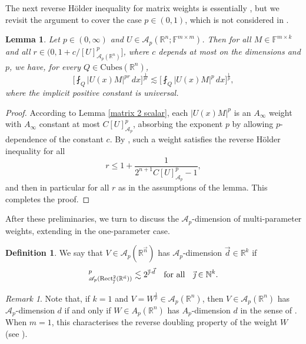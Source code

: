 \documentclass[11pt, reqno]{amsart}
\newtheorem{lemma}[theorem]{Lemma}
\theoremstyle{definition}
\newtheorem{definition}[theorem]{Definition}
\theoremstyle{remark}
\newtheorem{remark}[theorem]{Remark}
\numberwithin{equation}{section}
\newcommand{\A}{\mathscr A}
\newcommand{\F}{\mathbb F}
\newcommand{\N}{\mathbb N}
\newcommand{\R}{\mathbb R}
\newcommand{\vd}{\vec d}
\newcommand{\vj}{\vec{\textit{\j}}}
\newcommand{\vn}{\vec n}
\newcommand{\abs}[1]{|#1|}
\newcommand{\Cubes}{\mathrm{Cubes}}
\newcommand{\Rect}{\mathrm{Rect}}
\begin{document}
The next reverse H\"older inequality for matrix weights is essentially \cite[Lemma 2]{MR22}, but we revisit the argument to cover the case $p\in(0,1)$, which is not considered in \cite{MR22}.

\begin{lemma}\label{RHI}
Let $p\in(0,\infty)$ and $U\in\A_p(\R^n;\F^{m\times m})$. Then for all $M\in\F^{m\times k}$ and all $r\in(0,1+c/[U]_{\A_p(\R^n)}^p]$, where $c$ depends at most on the dimensions and $p$, we have,
for every $Q\in\Cubes(\R^n)$,
\begin{equation*}
\bigg[\fint_Q \abs{U(x)M}^{pr}\,dx\bigg]^{\frac{1}{pr}}
\lesssim \bigg[\fint_Q\abs{U(x)M}^{p}\,dx\bigg]^{\frac 1p},
\end{equation*}
where the implicit positive constant is universal.
\end{lemma}

\begin{proof}
According to Lemma \ref{matrix 2 scalar}, each $\abs{U(x)M}^p$ is an $A_\infty$ weight with $A_\infty$ constant at most $C[U]_{\A_p}^p$, absorbing the exponent $p$ by allowing $p$-dependence of the constant $c$. By \cite[Theorem 2.3]{HPR}, such a weight satisfies the reverse H\"older inequality for all
\begin{equation*}
r\leq 1+\frac{1}{2^{n+1}C [U]_{\A_p}^p-1},
\end{equation*}
and then in particular for all $r$ as in the assumptions of the lemma. This completes the proof.
\end{proof}

After these preliminaries, we turn to discuss the $\A_p$-dimension of multi-parameter weights, extending \cite[Definition 2.22]{BHYY:1a} in the one-parameter case.

\begin{definition}
We say that $V\in\A_{p}(\R^{\vn})$ has $\A_{p}$-dimension $\vd\in\R^k$ if
\begin{equation*}
[V]_{\A_{p}(\Rect^2_{\vj}(\R^{\vn}))}^p
\lesssim 2^{\vj\cdot\vd}\quad\text{for all}\quad\vj\in\N^k.
\end{equation*}
\end{definition}

\begin{remark}
Note that, if $k=1$ and $V=W^{\frac{1}{p}}\in\A_p(\R^n)$, then
$V\in\A_p(\R^n)$ has $\A_p$-dimension $d$ if and only if
$W\in A_p(\R^n)$ has $A_p$-dimension $d$ in the sense of \cite[Definition 2.22]{BHYY:1a}.
When $m=1$, this characterises the reverse doubling property of the weight $W$
(see \cite[Proposition 2.36]{BHYY:1a}).
\end{remark}
\end{document}
